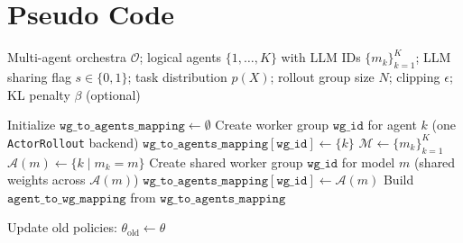 \section{Pseudo Code}
\label{app:pseudocode}
\begin{algorithm}[H]
\caption{Training Multi-Agent LLM Systems with \methodname{}}
\label{alg:pseudocode}
\begin{algorithmic}[1]
 Multi-agent orchestra $\mathcal{O}$; logical agents $\{1,\dots,K\}$ with LLM IDs $\{m_k\}_{k=1}^K$;
LLM sharing flag $s\in\{0,1\}$;
task distribution $p(X)$; rollout group size $N$;
clipping $\epsilon$; KL penalty $\beta$ (optional)

\vspace{0.5em}
\STATE \small{}
\STATE Initialize $\texttt{wg\_to\_agents\_mapping}\leftarrow \emptyset$
    \STATE \small{\color{gray}{// Non-sharing: each agent $k$ has a dedicated LLM worker group}}
        \STATE Create worker group $\texttt{wg\_id}$ for agent $k$ (one \texttt{ActorRollout} backend)
        \STATE $\texttt{wg\_to\_agents\_mapping}[\texttt{wg\_id}] \leftarrow \{k\}$
    \ENDFOR
\ELSE
    \STATE \small{\color{gray}{// Sharing: agents configured with the same LLM are mapped to one shared worker group}}
    \STATE $\mathcal{M}\leftarrow \{m_k\}_{k=1}^K$ \small{\color{gray}{// distinct LLM IDs}}
        \STATE $\mathcal{A}(m)\leftarrow \{k \mid m_k=m\}$ \small{\color{gray}{// agents using LLM $m$}}
        \STATE Create shared worker group $\texttt{wg\_id}$ for model $m$ (shared weights across $\mathcal{A}(m)$)
        \STATE $\texttt{wg\_to\_agents\_mapping}[\texttt{wg\_id}] \leftarrow \mathcal{A}(m)$
    \ENDFOR
\ENDIF
\STATE \small{}
\STATE Build $\texttt{agent\_to\_wg\_mapping}$ from $\texttt{wg\_to\_agents\_mapping}$

\vspace{0.5em}
\STATE \small{}
    \STATE \small{\color{gray}{// Snapshot current policy for importance ratios}}
    \STATE Update old policies: $\theta_{\text{old}}\leftarrow \theta$


\end{algorithmic}
\end{algorithm}
